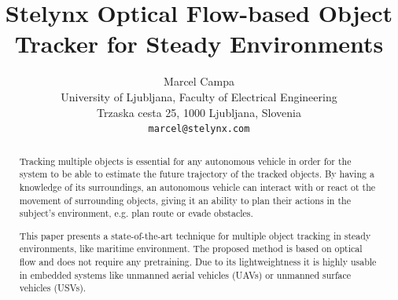 \documentclass[10pt,twocolumn,letterpaper]{article}
\begin{document}
\title{Stelynx Optical Flow-based Object Tracker for Steady Environments}

\author{Marcel Campa\\
University of Ljubljana, Faculty of Electrical Engineering\\
Trzaska cesta 25, 1000 Ljubljana, Slovenia\\
{\tt\small marcel@stelynx.com}
}

\maketitle
\ificcvfinal\thispagestyle{empty}\fi


\begin{abstract}
   Tracking multiple objects is essential for any autonomous vehicle in order for the
   system to be able to estimate the future trajectory of the tracked objects.
   By having a knowledge of its surroundings, an autonomous vehicle can interact
   with or react ot the movement of surrounding objects, giving it an ability
   to plan their actions in the subject's environment, e.g. plan route or evade
   obstacles.

   This paper presents a state-of-the-art technique for
   multiple object tracking in steady environments, like maritime environment. The proposed
   method is based on optical flow and does not require any pretraining. Due to
   its lightweightness it is highly usable in embedded systems like unmanned aerial
   vehicles (UAVs) or unmanned surface vehicles (USVs).
\end{abstract}


\end{document}
